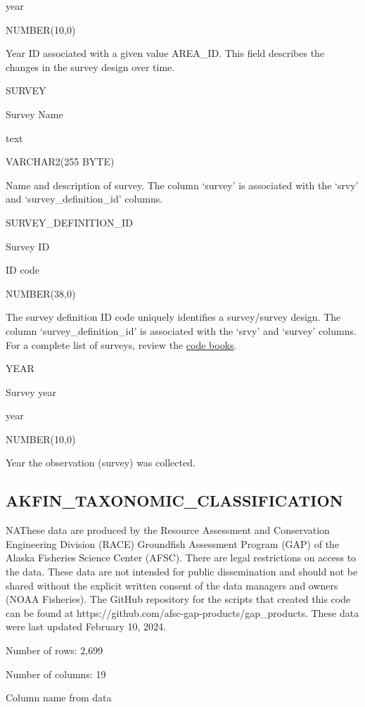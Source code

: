 \documentclass[
  letterpaper,
  oneside,
  open=any]{scrbook}
\begin{document}
year

NUMBER(10,0)

Year ID associated with a given value AREA\_ID. This field describes the
changes in the survey design over time.

SURVEY

Survey Name

text

VARCHAR2(255 BYTE)

Name and description of survey. The column `survey' is associated with
the `srvy' and `survey\_definition\_id' columns.

SURVEY\_DEFINITION\_ID

Survey ID

ID code

NUMBER(38,0)

The survey definition ID code uniquely identifies a survey/survey
design. The column `survey\_definition\_id' is associated with the
`srvy' and `survey' columns. For a complete list of surveys, review the
\href{https://www.fisheries.noaa.gov/resource/document/groundfish-survey-species-code-manual-and-data-codes-manual}{code
books}.

YEAR

Survey year

year

NUMBER(10,0)

Year the observation (survey) was collected.

\hypertarget{akfin_taxonomic_classification}{%
\subsection{AKFIN\_TAXONOMIC\_CLASSIFICATION}\label{akfin_taxonomic_classification}}

NAThese data are produced by the Resource Assessment and Conservation
Engineering Division (RACE) Groundfish Assessment Program (GAP) of the
Alaska Fisheries Science Center (AFSC). There are legal restrictions on
access to the data. These data are not intended for public dissemination
and should not be shared without the explicit written consent of the
data managers and owners (NOAA Fisheries). The GitHub repository for the
scripts that created this code can be found at
https://github.com/afsc-gap-products/gap\_products. These data were last
updated February 10, 2024.

Number of rows: 2,699

Number of columns: 19

Column name from data
\end{document}
